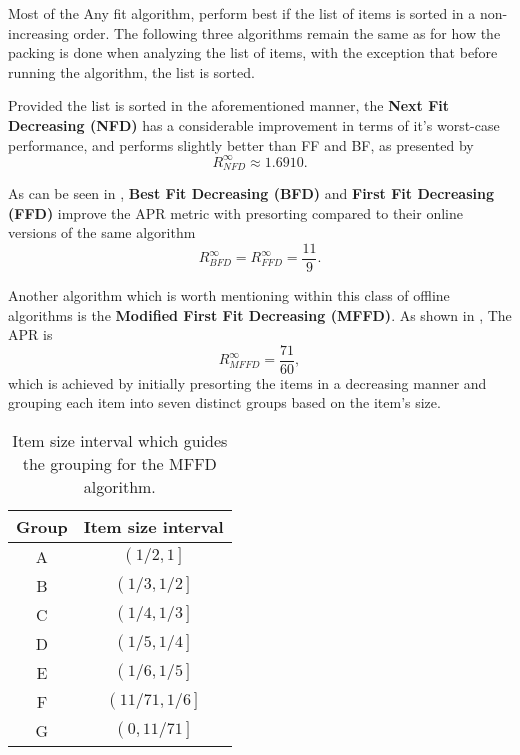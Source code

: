 Most of the Any fit algorithm, perform best if the list of items is sorted in a non-increasing order. The following three algorithms remain the same as for how the packing is done when analyzing the list of items, with the exception that before running the algorithm, the list is sorted.

Provided the list is sorted in the aforementioned manner, the \textbf{Next Fit Decreasing (NFD)} has a considerable improvement in terms of it's worst-case performance, and performs slightly better than FF and BF, as presented by \cite{baker1981tight}
\begin{equation}
    R_{NFD}^\infty \approx 1.6910.
\end{equation}

As can be seen in \cite{johnson1974worst}, \textbf{Best Fit Decreasing (BFD)} and \textbf{First Fit Decreasing (FFD)} improve the APR metric with presorting compared to their online versions of the same algorithm 
\begin{equation}
    R_{BFD}^\infty = R_{FFD}^\infty = \frac{11}{9}.
\end{equation}

Another algorithm which is worth mentioning within this class of offline algorithms is the \textbf{Modified First Fit Decreasing (MFFD)}. As shown in \cite{johnson19857160}, The APR is
\begin{equation}
    R_{MFFD}^\infty = \frac{71}{60},
\end{equation}
which is achieved by initially presorting the items in a decreasing manner and grouping each item into seven distinct groups based on the item's size. 

\begin{table}[H]
\caption{Item size interval which guides the grouping for the MFFD algorithm.}
\begin{center}
\begin{tabular}{ |c|c| } 
    \hline
    Group & Item size interval \\ 
    \hline
    A & $\left( 1/2, 1 \right]$ \\ 
    B & $\left( 1/3, 1/2 \right]$ \\ 
    C & $\left( 1/4, 1/3 \right]$ \\ 
    D & $\left( 1/5, 1/4 \right]$ \\ 
    E & $\left( 1/6, 1/5 \right]$ \\ 
    F & $\left( 11/71, 1/6 \right]$ \\ 
    G & $\left( 0, 11/71 \right]$ \\ 
\hline
\end{tabular}
\end{center}
\end{table}

